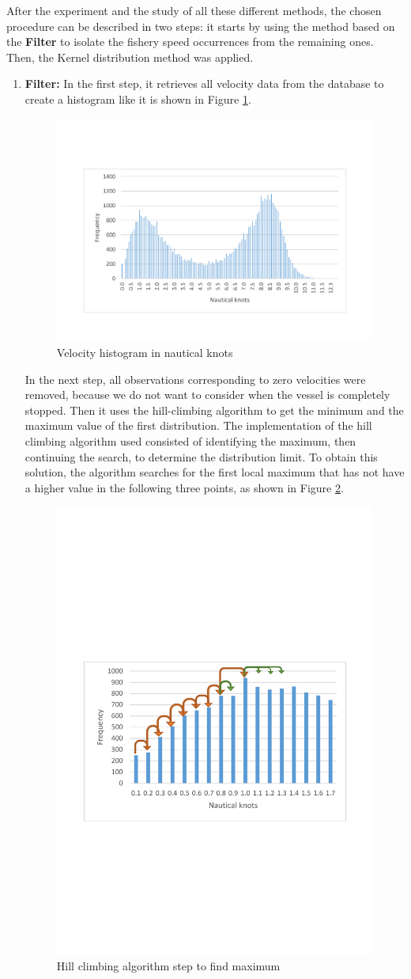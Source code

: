 After the experiment and the study of all these different methods, the chosen procedure can be described in two steps: it starts by using the method based on the \textbf{Filter} to isolate the fishery speed occurrences from the remaining ones. Then, the Kernel distribution method was applied.
\begin{enumerate}
\item \textbf{Filter:} In the first step, it retrieves all velocity data from the database to create a histogram like it is shown in Figure \ref{fig:app_b_1}.

\begin{figure}
    \centering
    \includegraphics[trim=0 80 0 80,height=0.45\linewidth]{Chapters/img/hist_vessel2.pdf}
    \caption{Velocity histogram in nautical knots}
    \label{fig:app_b_1}
\end{figure}

In the next step, all observations corresponding to zero velocities were removed, because we do not want to consider when the vessel is completely stopped. Then it uses the hill-climbing algorithm to get the minimum and the maximum value of the first distribution. 
The implementation of the hill climbing algorithm used consisted of identifying the maximum, then continuing the search, to determine the distribution limit.
To obtain this solution, the algorithm searches for the first local maximum that has not have a higher value in the following three points, as shown in Figure \ref{fig:app_b_3}.



\begin{figure}
    \centering
    \includegraphics[trim=300 250 300 300,height=0.5\linewidth]{Chapters/img/hc_3.pdf}
    \caption{Hill climbing algorithm step to find maximum}
    \label{fig:app_b_3}
\end{figure}


\end{enumerate}
